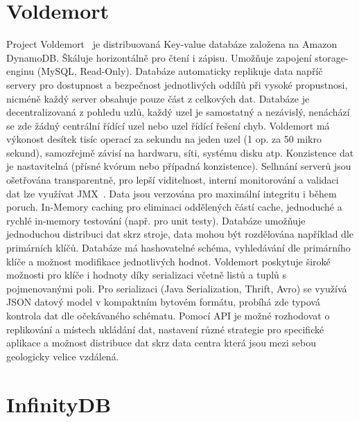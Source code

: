 \documentclass[czech,bachelor,dept460,male,csharp,cpdeclaration]{diploma}
\begin{document}
	\section{Voldemort}
	
	Project Voldemort~\cite{voldemort} je distribuovaná Key-value databáze založena na Amazon DynamoDB. Škáluje horizontálně pro čtení i zápisu. Umožňuje zapojení storage-enginu (MySQL, Read-Only). Databáze automaticky replikuje data napříč servery pro dostupnost a bezpečnost jednotlivých oddílů při vysoké propustnosi, nicméně každý server obsahuje pouze část z celkových dat. Databáze je decentralizovaná z pohledu uzlů, každý uzel je samostatný a nezávislý, nenáchází se zde žádný centrální řídící uzel nebo uzel řídící řešení chyb. Voldemort má výkonost desítek tisíc operací za sekundu na jeden uzel (1 op. za 50 mikro sekund), samozřejmě závisí na hardwaru, síti, systému disku atp. Konzistence dat je nastavitelná (přísné kvórum nebo případná konzistence). Selhnání serverů jsou ošetřována transparentně, pro lepší viditelnost, interní monitorování a validaci dat lze využívat JMX~\cite{jmx}. Data jsou verzována pro maximální integritu i během poruch. In-Memory caching pro eliminaci oddělených částí cache, jednoduché a rychlé in-memory testování (např. pro unit testy). Databáze umožňuje jednoduchou distribuci dat skrz stroje, data mohou být rozdělována například dle primárních klíčů. Databáze má hashovatelné schéma, vyhledávání dle primárního klíče a možnost modifikace jednotlivých hodnot. Voldemort poskytuje široké možnosti pro klíče i hodnoty díky serializaci včetně listů a tuplů s pojmenovanými poli. Pro serializaci (Java Serialization, Thrift, Avro) se využívá JSON datový model v kompaktním bytovém formátu, probíhá zde typová kontrola dat dle očekávaného schématu. Pomocí API je možné rozhodovat o replikování a místech ukládání dat, nastavení různé strategie pro specifické aplikace a možnost distribuce dat skrz data centra která jsou mezi sebou geologicky velice vzdálená.
	
	\section{InfinityDB}
	
\end{document}
